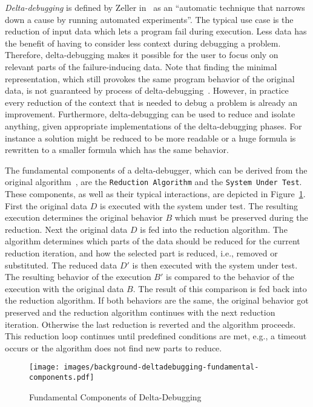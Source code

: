 \emph{Delta-debugging} is defined by Zeller in~\cite{zeller2009programs} as an \enquote{automatic technique that narrows down a cause by running automated experiments}. The typical use case is the reduction of input data which lets a program fail during execution. Less data has the benefit of having to consider less context during debugging a problem. Therefore, delta-debugging makes it possible for the user to focus only on relevant parts of the failure-inducing data. Note that finding the minimal representation, which still provokes the same program behavior of the original data, is not guaranteed by process of delta-debugging~\cite{brummayer2009fuzzing, brummayer2010automated}. However, in practice every reduction of the context that is needed to debug a problem is already an improvement. Furthermore, delta-debugging can be used to reduce and isolate anything, given appropriate implementations of the delta-debugging phases. For instance a solution might be reduced to be more readable or a huge formula is rewritten to a smaller formula which has the same behavior.

The fundamental components of a delta-debugger, which can be derived from the original algorithm~\cite{zeller2009programs}, are the \texttt{Reduction Algorithm} and the \texttt{System Under Test}. These components, as well as their typical interactions, are depicted in Figure~\ref{fig:backgroundDeltaDebuggingFundamentalComponents}. First the original data $D$ is executed with the system under test. The resulting execution determines the original behavior $B$ which must be preserved during the reduction. Next the original data $D$ is fed into the reduction algorithm. The algorithm determines which parts of the data should be reduced for the current reduction iteration, and how the selected part is reduced, i.e., removed or substituted. The reduced data $D'$ is then executed with the system under test. The resulting behavior of the execution $B'$ is compared to the behavior of the execution with the original data $B$. The result of this comparison is fed back into the reduction algorithm. If both behaviors are the same, the original behavior got preserved and the reduction algorithm continues with the next reduction iteration. Otherwise the last reduction is reverted and the algorithm proceeds. This reduction loop continues until predefined conditions are met, e.g., a timeout occurs or the algorithm does not find new parts to reduce.

\begin{figure}[t]
\texttt{[image: images/background-deltadebugging-fundamental-components.pdf]}
\caption{Fundamental Components of Delta-Debugging}
\label{fig:backgroundDeltaDebuggingFundamentalComponents}
\end{figure}

